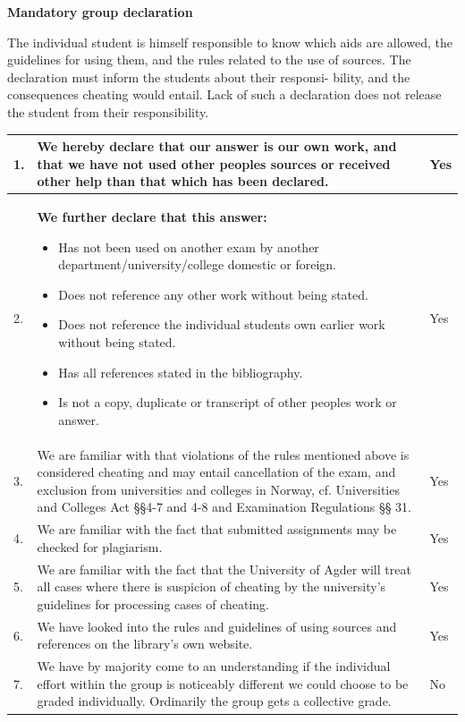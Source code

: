 

\large{\bf{Mandatory group declaration}} \\

{\small {}
The individual student is himself responsible to know which aids are allowed, the guidelines for using them,
and the rules related to the use of sources. The declaration must inform the students about their responsi-
bility, and the consequences cheating would entail. Lack of such a declaration does not release the student
from their responsibility.\\

\begin{center}
\begin{tabular}{ |p{1cm}|p{11.5cm}|p{1cm}|}
 \hline  
 
 1. & We hereby declare that our answer is our own work, and that we have not used other peoples sources or received other help than that which has been declared. & Yes \\
 \hline
 2. & \textbf{We further declare that this answer:}
 \begin{itemize}
    \item Has not been used on another exam by another department/university/college domestic or foreign.
    \item Does not reference any other work without being stated.
    \item Does not reference the individual students own earlier work without being stated.
    \item Has all references stated in the bibliography.
    \item Is not a copy, duplicate or transcript of other peoples work or answer.
 \end{itemize}& Yes \\
 \hline
 3. & We are familiar with that violations of the rules mentioned above is considered cheating and may entail cancellation of the exam, and exclusion from universities and colleges in Norway, cf. Universities and Colleges Act §§4-7 and 4-8 and Examination Regulations §§ 31.
 & Yes \\
 \hline
 4. & We are familiar with the fact that submitted assignments may be checked for plagiarism.
 & Yes \\
 \hline
 5. & We are familiar with the fact that the University of Agder will treat all cases where there is suspicion of cheating by the university’s guidelines for processing cases of cheating.
 & Yes \\
 \hline
 6. & We have looked into the rules and guidelines of using sources and references on the library’s own website.
 & Yes \\
 \hline
 7. & We have by majority come to an understanding if the individual effort within the group is noticeably different we could choose to be graded individually. Ordinarily the group gets a collective grade.
 & No \\
 \hline
\end{tabular}
\end{center}}


